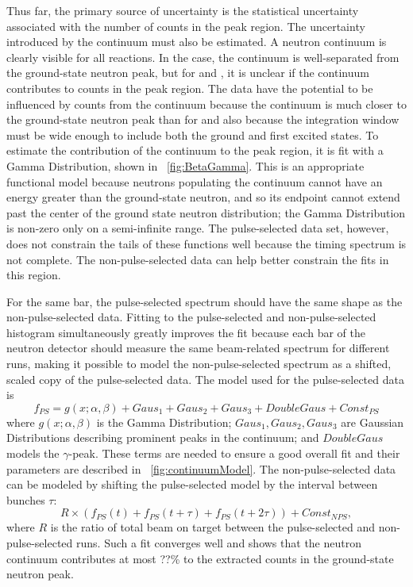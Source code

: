 Thus far, the primary source of uncertainty is the statistical uncertainty associated with the number of counts in the peak region.  The uncertainty introduced by the continuum must also be estimated.  A neutron continuum is clearly visible for all reactions.  In the  case, the continuum is well-separated from the ground-state neutron peak, but for  and , it is unclear if the continuum contributes to counts in the peak region.  The \reaction data have the potential to be influenced by counts from the continuum because the continuum is much closer to the ground-state neutron peak than for \MgReaction and also because the integration window must be wide enough to include both the ground and first excited states.  To estimate the contribution of the continuum to the peak region, it is fit with a Gamma Distribution, shown in {\fig}~\ref{fig:BetaGamma}.  This is an appropriate functional model because neutrons populating the continuum cannot have an energy greater than the ground-state neutron, and so its endpoint cannot extend past the center of the ground state neutron distribution; the Gamma Distribution is non-zero only on a semi-infinite range.  The pulse-selected data set, however, does not constrain the tails of these functions well because the timing spectrum is not complete.  The non-pulse-selected data can help better constrain the fits in this region.

For the same bar, the pulse-selected spectrum should have the same shape as the non-pulse-selected data.  Fitting to the pulse-selected and non-pulse-selected histogram simultaneously greatly improves the fit because each bar of the neutron detector should measure the same beam-related spectrum for different runs, making it possible to model the non-pulse-selected spectrum as a shifted, scaled copy of the pulse-selected data.  The model used for the pulse-selected data is
\begin{equation}
f_{PS} = g(x;\alpha,\beta) + Gaus_1 + Gaus_2 + Gaus_3 + DoubleGaus + Const_{PS}
\end{equation}
where $g(x;\alpha,\beta)$ is the Gamma Distribution; $Gaus_1, Gaus_2, Gaus_3$ are Gaussian Distributions describing prominent peaks in the continuum; and $DoubleGaus$ models the $\gamma$-peak.  These terms are needed to ensure a good overall fit and their parameters are described in {\fig}~\ref{fig:continuumModel}.  The non-pulse-selected data can be modeled by shifting the pulse-selected model by the interval between bunches $\tau$:
\begin{equation}
R\times(f_{PS}(t) + f_{PS}(t+\tau) + f_{PS}(t+2\tau)) + Const_{NPS},
\label{eq:NPS_model}
\end{equation}
where $R$ is the ratio of total beam on target between the pulse-selected and non-pulse-selected runs.  Such a fit converges well and shows that the neutron continuum contributes at most ??\% to the extracted counts in the ground-state neutron peak.  

